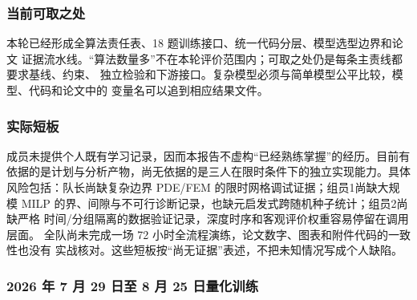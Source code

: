 \documentclass[UTF8,a4paper,12pt]{ctexart}
\begin{document}
\subsubsection{当前可取之处}

本轮已经形成全算法责任表、18 题训练接口、统一代码分层、模型选型边界和论文
证据流水线。“算法数量多”不在本轮评价范围内；可取之处仍是每条主责线都要求基线、约束、
独立检验和下游接口。复杂模型必须与简单模型公平比较，模型、代码和论文中的
变量名可以追到相应结果文件。

\subsubsection{实际短板}

成员未提供个人既有学习记录，因而本报告不虚构“已经熟练掌握”的经历。目前有
依据的是计划与分析产物，尚无依据的是三人在限时条件下的独立实现能力。具体
风险包括：队长尚缺复杂边界 PDE/FEM 的限时网格调试证据；组员1尚缺大规模
MILP 的界、间隙与不可行诊断记录，也缺元启发式跨随机种子统计；组员2尚缺严格
时间/分组隔离的数据验证记录，深度时序和客观评价权重容易停留在调用层面。
全队尚未完成一场 72 小时全流程演练，论文数字、图表和附件代码的一致性也没有
实战核对。这些短板按“尚无证据”表述，不把未知情况写成个人缺陷。

\subsubsection{2026 年 7 月 29 日至 8 月 25 日量化训练}
\end{document}

